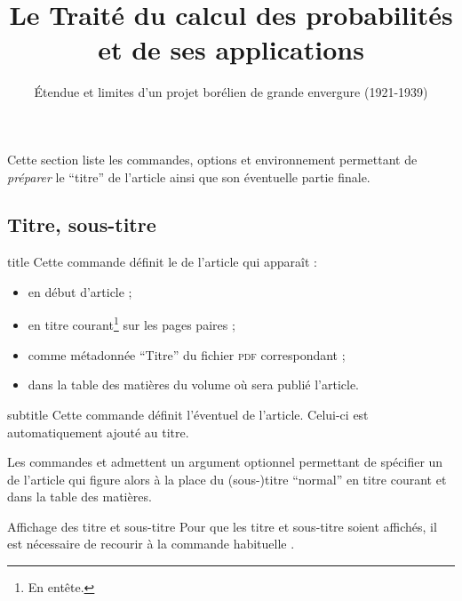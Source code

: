 Cette section liste les commandes, options et environnement permettant de
\emph{préparer} le \enquote{titre} de l'article ainsi que son éventuelle partie
finale.

\subsection{Titre, sous-titre}
\label{sec-titre}

\begin{docCommand}[doc description=\mandatory]{title}{}
  Cette commande définit le  de l'article qui apparaît :
  \begin{itemize}
  \item en début d'article ;
  \item en titre courant\footnote{En entête.} sur les pages paires ;
  \item comme métadonnée \enquote{Titre} du fichier \textsc{pdf} correspondant ;
  \item dans la table des matières du volume où sera publié l'article.
  \end{itemize}
\end{docCommand}

\begin{docCommand}{subtitle}{}
  Cette commande définit l'éventuel  de l'article. Celui-ci
  est automatiquement ajouté au titre.
\end{docCommand}

Les commandes  et  admettent un argument
optionnel permettant de spécifier un  de l'article qui
figure alors à la place du (sous-)titre \enquote{normal} en titre courant et
dans la table des matières.

\begin{bodycode}[listing options={deletekeywords={title,subtitle}}]
\title[Le Traité du calcul des probabilités]{Le Traité du calcul des
  probabilités et de ses applications}
\subtitle[Étendue et limites d'un projet borélien]{Étendue et limites
  d'un projet borélien de grande envergure (1921-1939)}
\end{bodycode}

\begin{dbremark}{Affichage des titre et sous-titre}{}
  Pour que les titre et sous-titre soient affichés, il est nécessaire de
  recourir à la commande habituelle .
\end{dbremark}

